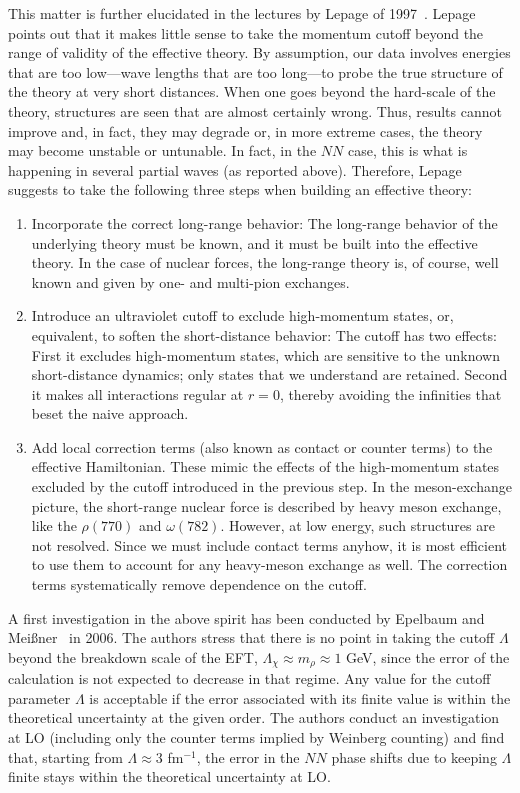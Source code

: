 \documentclass[sort&compress,preprint,3p]{elsarticle}
\begin{document}
This matter is further elucidated in
the lectures by Lepage of 1997~\cite{Lep97}.
Lepage points out that it makes little sense to take the momentum cutoff beyond
the range of validity of the effective theory. By assumption, our data involves energies
that are too low---wave lengths that are too long---to probe the true structure of
the theory at very short distances. When one goes beyond the hard-scale of the theory,
structures are seen that are almost certainly wrong. Thus, results cannot improve
and, in fact, they may degrade or, in more extreme cases, the theory may become
unstable or untunable. In fact, in the $NN$ case, this is what is happening in 
several partial waves (as reported above). Therefore, Lepage
suggests to take the following three steps when building an effective theory:
\begin{enumerate}
\item
Incorporate the correct long-range behavior: The long-range behavior of the underlying
theory must be known, and it must be built into the effective theory. In the case of
nuclear forces, the long-range theory is, of course, well known and 
given by one- and multi-pion exchanges.
\item
Introduce an ultraviolet cutoff to exclude high-momentum states, or, equivalent, to soften the 
short-distance behavior: The cutoff has two effects: First it excludes high-momentum states,
which are sensitive to the unknown short-distance dynamics; only states that we understand
are retained. Second it makes all interactions regular at $r=0$, thereby avoiding the infinities
that beset the naive approach.
\item
Add local correction terms (also known as contact or counter terms) 
to the effective Hamiltonian. These mimic the effects of the 
high-momentum states excluded by the cutoff introduced in the previous step.
In the meson-exchange picture, the short-range nuclear force is described by
heavy meson exchange, like the $\rho(770)$ and $\omega(782)$. However, at low
energy, such structures are not resolved. Since we must include contact terms 
anyhow, it is most efficient to use them to account for any heavy-meson exchange
as well.
The correction terms systematically remove dependence on the cutoff.
\end{enumerate}

A first investigation in the above spirit has been
conducted by Epelbaum and Mei\ss ner~\cite{EM06} in 2006.
The authors stress that there is no point in taking the cutoff $\Lambda$ beyond the
breakdown scale of the EFT, $\Lambda_\chi \approx m_\rho \approx 1$ GeV,
since the error of the calculation is not expected to decrease
in that regime.
Any value for the cutoff parameter $\Lambda$
is acceptable if the error associated with its finite value is within
the theoretical uncertainty at the given order.
The authors conduct an investigation at LO (including only the counter terms
implied by Weinberg counting)
and find that,
starting from $\Lambda \approx 3$ fm$^{-1}$, the error
in the $NN$ phase shifts due to keeping $\Lambda$ finite
stays within the theoretical uncertainty at LO.
\end{document}
